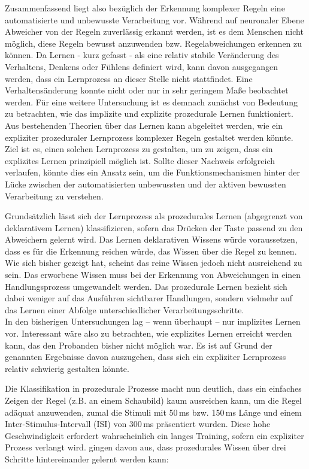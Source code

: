 \documentclass[doc,a4paper,12pt]{apa6}
\begin{document}
Zusammenfassend liegt also bezüglich der Erkennung komplexer Regeln eine automatisierte und unbewusste Verarbeitung vor. Während auf neuronaler Ebene Abweicher von der Regeln zuverlässig erkannt werden, ist es dem Menschen nicht möglich, diese Regeln bewusst anzuwenden bzw. Regelabweichungen erkennen zu können. Da Lernen - kurz gefasst - als eine relativ stabile Veränderung des Verhaltens, Denkens oder Fühlens definiert wird, kann davon ausgegangen werden, dass ein Lernprozess an dieser Stelle nicht stattfindet. Eine Verhaltensänderung konnte nicht oder nur in sehr geringem Maße beobachtet werden. Für eine weitere Untersuchung ist es demnach zunächst von Bedeutung zu betrachten, wie das implizite und explizite prozedurale Lernen funktioniert. Aus bestehenden Theorien über das Lernen kann abgeleitet werden, wie ein expliziter prozeduraler Lernprozess komplexer Regeln gestaltet werden könnte. Ziel ist es, einen solchen Lernprozess zu gestalten, um zu zeigen, dass ein explizites Lernen prinzipiell möglich ist. Sollte dieser Nachweis erfolgreich verlaufen, könnte dies ein Ansatz sein, um die Funktionsmechanismen hinter der Lücke zwischen der automatisierten unbewussten und der aktiven bewussten Verarbeitung zu verstehen.

Grundsätzlich lässt sich der Lernprozess als prozedurales Lernen (abgegrenzt von deklarativem Lernen) klassifizieren, sofern das Drücken der Taste passend zu den Abweichern gelernt wird. Das Lernen deklarativen Wissens würde voraussetzen, dass es für die Erkennung reichen würde, das Wissen über die Regel zu kennen. Wie sich bisher gezeigt hat, scheint das reine Wissen jedoch nicht ausreichend zu sein. Das erworbene Wissen muss bei der Erkennung von Abweichungen in einen Handlungsprozess umgewandelt werden. Das prozedurale Lernen bezieht sich dabei weniger auf das Ausführen sichtbarer Handlungen, sondern vielmehr auf das Lernen einer Abfolge unterschiedlicher Verarbeitungsschritte.\\
In den bisherigen Untersuchungen lag – wenn überhaupt – nur implizites Lernen vor. Interessant wäre also zu betrachten, wie explizites Lernen erreicht werden kann, das den Probanden bisher nicht möglich war. Es ist auf Grund der genannten Ergebnisse davon auszugehen, dass sich ein expliziter Lernprozess relativ schwierig gestalten könnte.

Die Klassifikation in prozedurale Prozesse macht nun deutlich, dass ein einfaches Zeigen der Regel (z.B. an einem Schaubild) kaum ausreichen kann, um die Regel adäquat anzuwenden, zumal die Stimuli mit 50\,ms bzw. 150\,ms Länge und einem Inter-Stimulus-Intervall (ISI) von 300\,ms präsentiert wurden. Diese hohe Geschwindigkeit erfordert wahrscheinlich ein langes Training, sofern ein expliziter Prozess verlangt wird. \textcite{fitts1967human} gingen davon aus, dass prozedurales Wissen über drei Schritte hintereinander gelernt werden kann:
\end{document}
